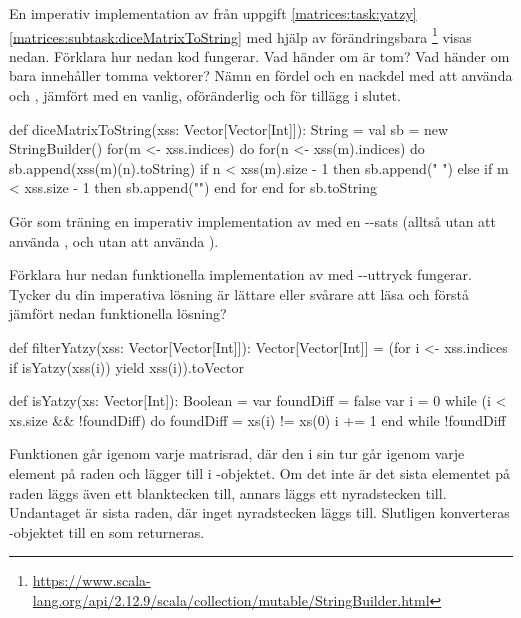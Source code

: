 \Subtask En imperativ implementation av  från uppgift \ref{matrices:task:yatzy}\ref{matrices:subtask:diceMatrixToString} med hjälp av förändringsbara  \footnote{\url{https://www.scala-lang.org/api/2.12.9/scala/collection/mutable/StringBuilder.html}} visas nedan. Förklara hur nedan kod fungerar. Vad händer om  är tom? Vad händer om  bara innehåller tomma vektorer? Nämn en fördel och en nackdel med att använda  och , jämfört med en vanlig, oföränderlig  och \code{+} för tillägg i slutet.
\begin{Code}
def diceMatrixToString(xss: Vector[Vector[Int]]): String = 
  val sb = new StringBuilder()
  for(m <- xss.indices) do
    for(n <- xss(m).indices) do
      sb.append(xss(m)(n).toString)
      if n < xss(m).size - 1 then sb.append(" ")
      else if m < xss.size - 1 then sb.append("\n")
    end for
  end for
  sb.toString
\end{Code}

\Subtask Gör som träning en imperativ implementation av  med en --sats (alltså utan att använda , och utan att använda ).


\Subtask Förklara hur nedan funktionella implementation av  med --uttryck fungerar. Tycker du din imperativa lösning är lättare eller svårare att läsa och förstå jämfört nedan funktionella lösning?
\begin{CodeSmall}
def filterYatzy(xss: Vector[Vector[Int]]): Vector[Vector[Int]] = 
  (for i <- xss.indices if isYatzy(xss(i)) yield xss(i)).toVector
\end{CodeSmall}


\SOLUTION

\TaskSolved \what

\SubtaskSolved  \begin{Code}
def isYatzy(xs: Vector[Int]): Boolean = 
  var foundDiff = false
  var i = 0
  while (i < xs.size && !foundDiff) do
    foundDiff = xs(i) != xs(0)
    i += 1
  end while
  !foundDiff
\end{Code}


\SubtaskSolved  Funktionen går igenom varje matrisrad, där den i sin tur går igenom
varje element på raden och lägger till i -objektet. Om det inte är
det sista elementet på raden läggs även ett blanktecken till, annars läggs ett
nyradstecken till. Undantaget är sista raden, där inget nyradstecken läggs till.
Slutligen konverteras -objektet till en  som
returneras.


